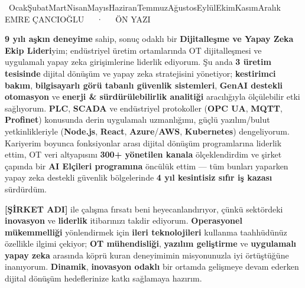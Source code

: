 \documentclass[11pt, a4paper]{awesome-cv}
\newcommand{\ph}[1]{\textcolor{awesome-red}{\bfseries #1}}
\newcommand{\turkishfulldate}{%
  \number\day\ \ifcase\month\or Ocak\or Şubat\or Mart\or Nisan\or Mayıs\or Haziran\or Temmuz\or Ağustos\or Eylül\or Ekim\or Kasım\or Aralık\fi\ \number\year
}
\begin{document}
\makecvheader[R]
\vspace{-10mm}

\makecvfooter
  {\turkishfulldate}
  {EMRE ÇANCIOĞLU~~~·~~~ÖN YAZI}
  {}

\makelettertitle


\begin{cvletter}

\textbf{9 yılı aşkın deneyime} sahip, sonuç odaklı bir \textbf{Dijitalleşme ve Yapay Zeka Ekip Lideri}yim; endüstriyel üretim ortamlarında OT dijitalleşmesi ve uygulamalı yapay zeka girişimlerine liderlik ediyorum. Şu anda \textbf{3 üretim tesisinde} dijital dönüşüm ve yapay zeka stratejisini yönetiyor; \textbf{kestirimci bakım}, \textbf{bilgisayarlı görü tabanlı güvenlik sistemleri}, \textbf{GenAI destekli otomasyon} ve \textbf{enerji \& sürdürülebilirlik analitiği} aracılığıyla ölçülebilir etki sağlıyorum. \textbf{PLC}, \textbf{SCADA} ve endüstriyel protokoller (\textbf{OPC UA}, \textbf{MQTT}, \textbf{Profinet}) konusunda derin uygulamalı uzmanlığımı, güçlü yazılım/bulut yetkinlikleriyle (\textbf{Node.js}, \textbf{React}, \textbf{Azure}/\textbf{AWS}, \textbf{Kubernetes}) dengeliyorum. Kariyerim boyunca fonksiyonlar arası dijital dönüşüm programlarına liderlik ettim, OT veri altyapısını \textbf{300+ yönetilen kanala} ölçeklendirdim ve şirket çapında bir \textbf{AI Elçileri programına} öncülük ettim --- tüm bunları yaparken yapay zeka destekli güvenlik bölgelerinde \textbf{4 yıl kesintisiz sıfır iş kazası} sürdürdüm.

\lettersection{Neden \ph{[ŞİRKET ADI]}?}
\ph{[ŞİRKET ADI]} ile çalışma fırsatı beni heyecanlandırıyor, çünkü sektördeki \textbf{inovasyon} ve \textbf{liderlik} itibarınızı takdir ediyorum. \textbf{Operasyonel mükemmelliği} yönlendirmek için \textbf{ileri teknolojileri} kullanma taahhüdünüz özellikle ilgimi çekiyor; \textbf{OT mühendisliği}, \textbf{yazılım geliştirme} ve \textbf{uygulamalı yapay zeka} arasında köprü kuran deneyimimin misyonunuzla iyi örtüştüğüne inanıyorum. \textbf{Dinamik}, \textbf{inovasyon odaklı} bir ortamda gelişmeye devam ederken dijital dönüşüm hedeflerinize katkı sağlamaya hazırım.


\end{cvletter}
\end{document}
